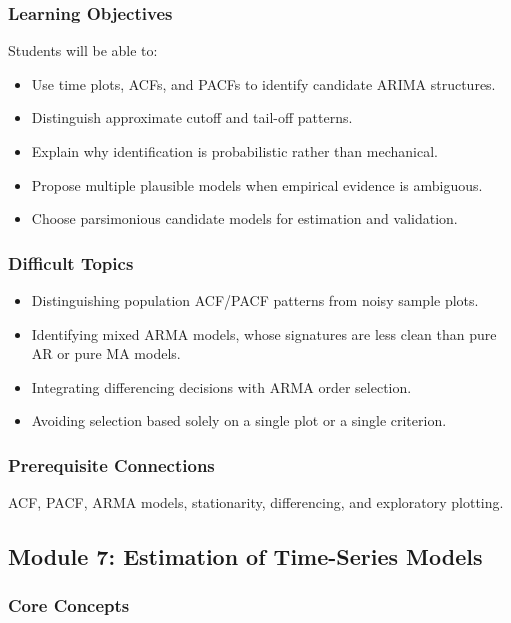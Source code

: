 \documentclass[11pt]{article}
\begin{document}
\subsubsection{Learning Objectives}

Students will be able to:

\begin{itemize}
    \item Use time plots, ACFs, and PACFs to identify candidate ARIMA structures.
    \item Distinguish approximate cutoff and tail-off patterns.
    \item Explain why identification is probabilistic rather than mechanical.
    \item Propose multiple plausible models when empirical evidence is
    ambiguous.
    \item Choose parsimonious candidate models for estimation and validation.
\end{itemize}

\subsubsection{Difficult Topics}

\begin{itemize}
    \item Distinguishing population ACF/PACF patterns from noisy sample plots.
    \item Identifying mixed ARMA models, whose signatures are less clean than
    pure AR or pure MA models.
    \item Integrating differencing decisions with ARMA order selection.
    \item Avoiding selection based solely on a single plot or a single
    criterion.
\end{itemize}

\subsubsection{Prerequisite Connections}

ACF, PACF, ARMA models, stationarity, differencing, and exploratory plotting.

\subsection{Module 7: Estimation of Time-Series Models}

\subsubsection{Core Concepts}
\end{document}
